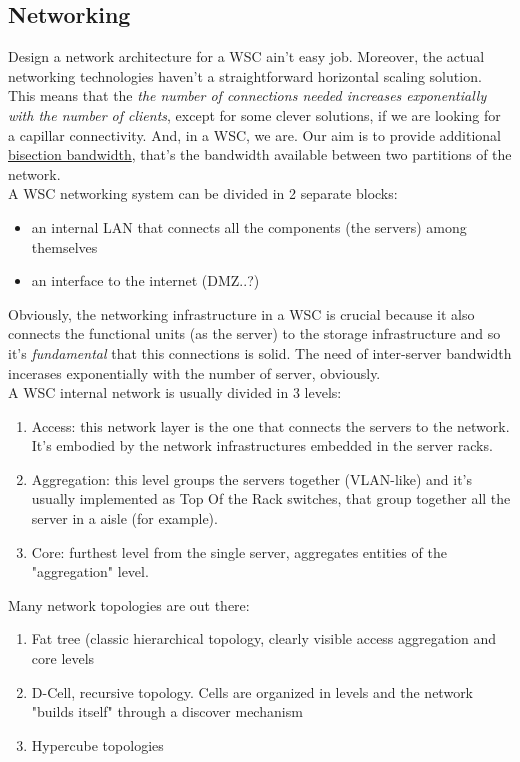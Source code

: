 \documentclass{article}
\begin{document}
			\subsection{Networking}
				Design a network architecture for a WSC ain't easy job. Moreover, the actual networking technologies haven't a straightforward horizontal scaling solution. This means that the \emph{the number of connections needed increases exponentially with the number of clients}, except for some clever solutions, if we are looking for a capillar connectivity. And, in a WSC, we are. Our aim is to provide additional \underline{bisection bandwidth}, that's the bandwidth available between two partitions of the network.\\ 
				A WSC networking system can be divided in 2 separate blocks:
				\begin{itemize}
					\item an internal LAN that connects all the components (the servers) among themselves
					\item an interface to the internet (DMZ..?)
				\end{itemize}
				
				Obviously, the networking infrastructure in a WSC is crucial because it also connects the functional units (as the server) to the storage infrastructure and so it's \emph{fundamental} that this connections is solid. The need of inter-server bandwidth incerases exponentially with the number of server, obviously.\\
				A WSC internal network is usually divided in 3 levels:
				\begin{enumerate}
					\item Access: this network layer is the one that connects the servers to the network. It's embodied by the network infrastructures embedded in the server racks.
					\item Aggregation: this level groups the servers together (VLAN-like) and it's usually implemented as Top Of the Rack switches, that group together all the server in a aisle (for example).
					\item Core: furthest level from the single server, aggregates entities of the "aggregation" level.
				\end{enumerate}
				Many network topologies are out there:
				\begin{enumerate}
					\item Fat tree (classic hierarchical topology, clearly visible access aggregation and core levels
					\item D-Cell, recursive topology. Cells are organized in levels and the network "builds itself" through a discover mechanism
					\item Hypercube topologies
				\end{enumerate}
				
\end{document}
